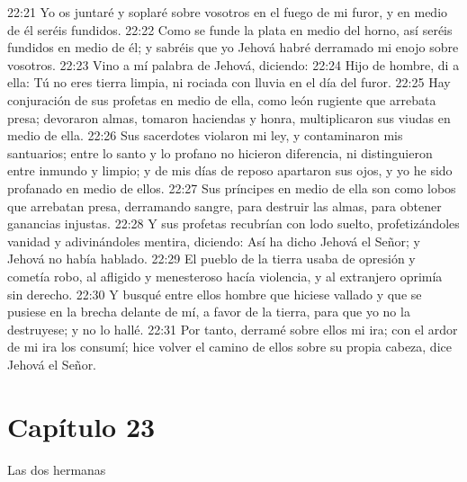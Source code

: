 22:21 Yo os juntaré y soplaré sobre vosotros en el fuego de mi furor, y en medio de él seréis fundidos.   
22:22 Como se funde la plata en medio del horno, así seréis fundidos en medio de él; y sabréis que yo Jehová habré derramado mi enojo sobre vosotros.   
22:23 Vino a mí palabra de Jehová, diciendo:   
22:24 Hijo de hombre, di a ella: Tú no eres tierra limpia, ni rociada con lluvia en el día del furor.   
22:25 Hay conjuración de sus profetas en medio de ella, como león rugiente que arrebata presa; devoraron almas, tomaron haciendas y honra, multiplicaron sus viudas en medio de ella.   
22:26 Sus sacerdotes violaron mi ley, y contaminaron mis santuarios; entre lo santo y lo profano no hicieron diferencia, ni distinguieron entre inmundo y limpio;  y de mis días de reposo apartaron sus ojos, y yo he sido profanado en medio de ellos.   
22:27 Sus príncipes en medio de ella son como lobos que arrebatan presa, derramando sangre, para destruir las almas, para obtener ganancias injustas.   
22:28 Y sus profetas recubrían con lodo suelto, profetizándoles vanidad y adivinándoles mentira, diciendo: Así ha dicho Jehová el Señor; y Jehová no había hablado.   
22:29 El pueblo de la tierra usaba de opresión y cometía robo, al afligido y menesteroso hacía violencia, y al extranjero oprimía sin derecho.   
22:30 Y busqué entre ellos hombre que hiciese vallado y que se pusiese en la brecha delante de mí, a favor de la tierra, para que yo no la destruyese; y no lo hallé.   
22:31 Por tanto, derramé sobre ellos mi ira; con el ardor de mi ira los consumí; hice volver el camino de ellos sobre su propia cabeza, dice Jehová el Señor.   
\section*{Capítulo 23  }
Las dos hermanas   
  
